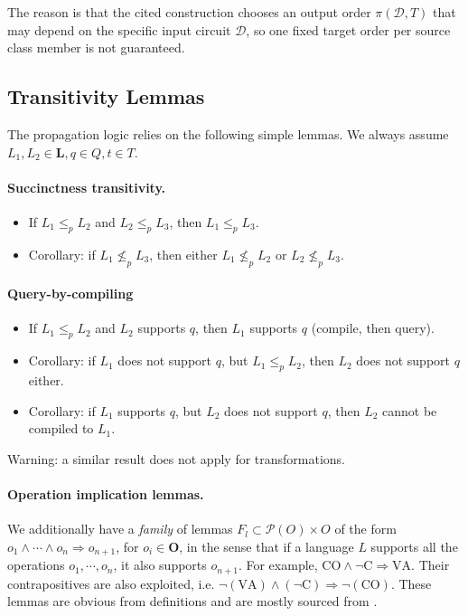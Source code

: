 \documentclass[10pt]{article}
\theoremstyle{plain}
\theoremstyle{definition}
\theoremstyle{remark}
\begin{document}
The reason is that the cited construction chooses an output order $\pi(\mathcal{D},T)$ that may depend
on the specific input circuit $\mathcal{D}$, so one fixed target order per source class member is not guaranteed.



\subsection{Transitivity Lemmas}

The propagation logic relies on the following simple lemmas. We always assume $L_1,L_2 \in \textbf{L}, q \in Q, t \in T$.

\paragraph{Succinctness transitivity.}
\begin{itemize}
  \item{If $L_1 \leq_p L_2$ and $L_2 \leq_p L_3$, then $L_1 \leq_p L_3$.}
  \item{Corollary: if $L_1 \not\leq_p L_3$, then either $L_1 \not\leq_p L_2$ or $L_2 \not\leq_p L_3$.}
\end{itemize}
 
\paragraph{Query-by-compiling}
\begin{itemize}
\item{If $L_1 \leq_p L_2$ and $L_2$ supports $q$, then $L_1$ supports $q$ (compile, then query).}
\item{Corollary: if $L_1$ does not support $q$, but $L_1 \leq_p L_2$, then $L_2$ does not support $q$ either.}
\item{Corollary: if $L_1$ supports $q$, but $L_2$ does not support $q$, then $L_2$ cannot be compiled to $L_1$.}
\end{itemize}

Warning: a similar result does not apply for transformations.

\paragraph{Operation implication lemmas.}
We additionally have a \emph{family} of lemmas $F_l \subset \mathcal{P}(O) \times O$ of the form $o_1 \wedge \cdots \wedge o_n \Rightarrow o_{n+1}$, for $o_i\in \textbf{O}$, in the sense that if a language $L$ supports all the operations $o_1, \cdots, o_n$, it also supports $o_{n+1}$. For example, $\text{CO} \wedge \lnot\text{C} \Rightarrow \text{VA}$. Their contrapositives are also exploited, i.e. $\neg(\text{VA}) \wedge (\neg \text{C}) \Rightarrow \neg(\text{CO})$. These lemmas are obvious from definitions and are mostly sourced from \citep{Darwiche_2002}.
\end{document}
